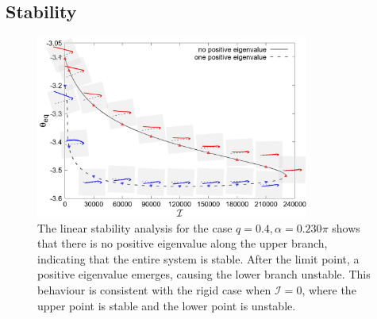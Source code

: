 \documentclass[a4paper,12pt]{report}
\begin{document}
\subsection{Stability}
\begin{figure}[!h]
	\begin{center}
		\includegraphics[width=0.8\textwidth]{plot/RESLT_q_0.40_alpha_0.230pi_plot_step_refine2_new_recale_FSI/combine_elastic_beam_I_theta_q_0.40_alpha_0.230pi_initial_-4.80_refine2_15_new_not_log_dash_line.png}
		\caption{The linear stability analysis for the case $q=0.4,\alpha=0.230\pi$ shows that there is no positive eigenvalue along the upper branch, indicating that the entire system is stable. After the limit point, a positive eigenvalue emerges, causing the lower branch unstable. This behaviour is consistent with the rigid case when $\mathcal{I}=0$, where the upper point is stable and the lower point is unstable.}
		\label{fig:10}
	\end{center}
\end{figure}
\end{document}
